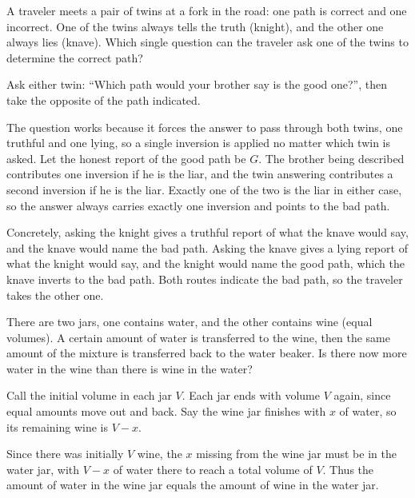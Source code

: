 \begin{problem}
A traveler meets a pair of twins at a fork in the road: one path is correct and one incorrect. One of the twins always tells the truth (knight), and the other one always lies (knave). Which single question can the traveler ask one of the twins to determine the correct path?
\end{problem}

\begin{solution}
Ask either twin: ``Which path would your brother say is the good one?'', then take the opposite of the path indicated.

The question works because it forces the answer to pass through both twins, one truthful and one lying, so a single inversion is applied no matter which twin is asked. Let the honest report of the good path be $G$. The brother being described contributes one inversion if he is the liar, and the twin answering contributes a second inversion if he is the liar. Exactly one of the two is the liar in either case, so the answer always carries exactly one inversion and points to the bad path.

Concretely, asking the knight gives a truthful report of what the knave would say, and the knave would name the bad path. Asking the knave gives a lying report of what the knight would say, and the knight would name the good path, which the knave inverts to the bad path. Both routes indicate the bad path, so the traveler takes the other one.
\end{solution}

\newpage

\begin{problem}

\vspace{-1ex}
There are two jars, one contains water, and the other contains wine (equal volumes). A certain amount of water is transferred to the wine, then the same amount of the mixture is transferred back to the water beaker. Is there now more water in the wine than there is wine in the water?
\end{problem}

\begin{solution}
Call the initial volume in each jar $V$. Each jar ends with volume $V$ again, since equal amounts move out and back. Say the wine jar finishes with $x$ of water, so its remaining wine is $V-x$.

Since there was initially $V$ wine, the $x$ missing from the wine jar must be in the water jar, with $V-x$ of water there to reach a total volume of $V$. Thus the amount of water in the wine jar equals the amount of wine in the water jar.
\end{solution}

